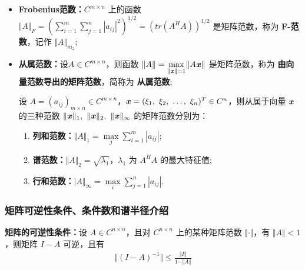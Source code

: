             \begin{itemize}
                \item \textbf{Frobenius范数：}$C^{m \times n}$ 上的函数 $\Vert A \Vert_F = (\sum_{i=1}^{m}\sum_{j=1}^{n}|a_{ij}|^2)^{1/2} = (tr(A^HA))^{1/2}$ 是矩阵范数，称为 \textbf{F-范数}，记作 $\Vert A \Vert_{m_2}$;
                \item \textbf{从属范数：}设$A \in C^{m \times n}$，则函数 $\Vert A \Vert = \underset{\Vert \textbf{\textit{x}} \Vert = 1}\max \Vert A\textbf{\textit{x}} \Vert$ 是矩阵范数，称为 \textbf{由向量范数导出的矩阵范数}，简称为 \textbf{从属范数};
                    \par 设 $A = (a_{ij})_{m \times n} \in C^{m \times n}$，$\textbf{\textit{x}} = (\xi_1, \ \xi_2, \ \dots, \ \xi_n)^T \in C^n$，则从属于向量 $\textbf{\textit{x}}$ 的三种范数 $\Vert \textbf{\textit{x}} \Vert_1, \ \Vert \textbf{\textit{x}} \Vert_2, \ \Vert \textbf{\textit{x}} \Vert_{\infty}$ 的矩阵范数分别为：
                    \begin{enumerate}
                        \item \textbf{列和范数：}$\Vert A \Vert_1 = \underset{j}\max \sum_{i=1}^{m}|a_{ij}|$;
                        \item \textbf{谱范数：}$\Vert A \Vert_2 = \sqrt{\lambda_1}$，$\lambda_1$ 为 $A^HA$ 的最大特征值;
                        \item \textbf{行和范数：}$\vert A \Vert_{\infty} = \underset{i}\max \sum_{j=1}^{n}|a_{ij}|$. 
                    \end{enumerate}
            \end{itemize}
        \subsubsection{矩阵可逆性条件、条件数和谱半径介绍}
            \par \textbf{矩阵的可逆性条件：}设 $A \in C^{n \times n}$，且对 $C^{n \times n}$ 上的某种矩阵范数 $\Vert \cdot \Vert$，有 $\Vert A \Vert < 1$，则矩阵 $I-A$ 可逆，且有
            \begin{align*}
                \Vert (I-A)^{-1} \Vert \leq \frac{\Vert I \Vert}{1 - \Vert A \Vert}
            \end{align*}
        
